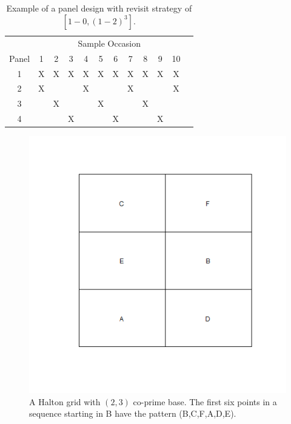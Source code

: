 \documentclass[]{article}
\begin{document}
\begin{table}
	\begin{tabular}{c c c c c c c c c c c c}
		\hline
		& \multicolumn{10}{c}{Sample Occasion}\\ 
		\cline{2-11}
		Panel & 1 & 2 & 3 & 4 & 5 & 6 & 7 & 8 & 9 & 10 \\ \hline
		1 & X & X & X & X & X & X & X & X & X & X \\
		2 & X &   &  &X &   &   & X &   &  & X \\
		3 &   & X &  &  & X &   &   & X &  &   \\
		4 &   &   &  X  &   &   & X &   &  & X \\
		\hline
	\end{tabular} 
	\caption{Example of a panel design with revisit strategy of $[1-0,(1-2)^3]$.}
	\label{Panel}
\end{table}

\begin{figure}
	\includegraphics[scale = 0.5]{HaltonGrid}
	\caption{A Halton grid with $(2,3)$ co-prime base. The first six points in a sequence starting in B have the pattern (B,C,F,A,D,E).}
	\label{grid}
\end{figure}
\end{document}

